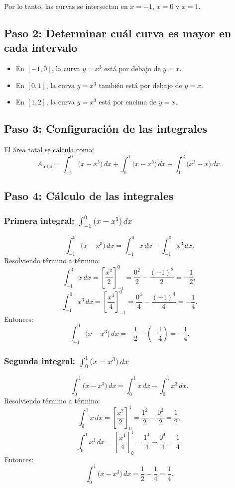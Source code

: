 \documentclass[11pt,letterpaper]{article}
\begin{document}
Por lo tanto, las curvas se intersectan en \( x = -1 \), \( x = 0 \) y \( x = 1 \).

\subsection*{Paso 2: Determinar cuál curva es mayor en cada intervalo}
\begin{itemize}
 \item En \([-1, 0]\), la curva \( y = x^3 \) está por debajo de \( y = x \).
 \item En \([0, 1]\), la curva \( y = x^3 \) también está por debajo de \( y = x \).
 \item En \([1, 2]\), la curva \( y = x^3 \) está por encima de \( y = x \).
\end{itemize}

\subsection*{Paso 3: Configuración de las integrales}
El área total se calcula como:
\[
A_{\text{total}} = \int_{-1}^0 \big(x - x^3\big) \, dx + \int_0^1 \big(x - x^3\big) \, dx + \int_1^2 \big(x^3 - x\big) \, dx.
\]

\subsection*{Paso 4: Cálculo de las integrales}

\subsubsection*{Primera integral: \( \int_{-1}^0 \big(x - x^3\big) \, dx \)}
\[
\int_{-1}^0 \big(x - x^3\big) \, dx = \int_{-1}^0 x \, dx - \int_{-1}^0 x^3 \, dx.
\]
Resolviendo término a término:
\[
\int_{-1}^0 x \, dx = \left[\frac{x^2}{2}\right]_{-1}^0 = \frac{0^2}{2} - \frac{(-1)^2}{2} = -\frac{1}{2},
\]
\[
\int_{-1}^0 x^3 \, dx = \left[\frac{x^4}{4}\right]_{-1}^0 = \frac{0^4}{4} - \frac{(-1)^4}{4} = -\frac{1}{4}.
\]
Entonces:
\[
\int_{-1}^0 \big(x - x^3\big) \, dx = -\frac{1}{2} - \left(-\frac{1}{4}\right) = -\frac{1}{4}.
\]

\subsubsection*{Segunda integral: \( \int_0^1 \big(x - x^3\big) \, dx \)}
\[
\int_0^1 \big(x - x^3\big) \, dx = \int_0^1 x \, dx - \int_0^1 x^3 \, dx.
\]
Resolviendo término a término:
\[
\int_0^1 x \, dx = \left[\frac{x^2}{2}\right]_0^1 = \frac{1^2}{2} - \frac{0^2}{2} = \frac{1}{2},
\]
\[
\int_0^1 x^3 \, dx = \left[\frac{x^4}{4}\right]_0^1 = \frac{1^4}{4} - \frac{0^4}{4} = \frac{1}{4}.
\]
Entonces:
\[
\int_0^1 \big(x - x^3\big) \, dx = \frac{1}{2} - \frac{1}{4} = \frac{1}{4}.
\]
\end{document}
